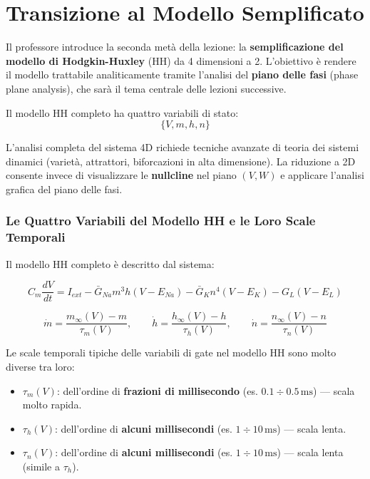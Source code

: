 \newpage

\section{Transizione al Modello Semplificato}


Il professore introduce la seconda metà della lezione: la \textbf{semplificazione del modello di Hodgkin-Huxley} (HH) da 4 dimensioni a 2. L'obiettivo è rendere il modello trattabile analiticamente tramite l'analisi del \textbf{piano delle fasi} (phase plane analysis), che sarà il tema centrale delle lezioni successive.

Il modello HH completo ha quattro variabili di stato:
\begin{equation}
\{V, m, h, n\}
\end{equation}

L'analisi completa del sistema 4D richiede tecniche avanzate di teoria dei sistemi dinamici (varietà, attrattori, biforcazioni in alta dimensione). La riduzione a 2D consente invece di visualizzare le \textbf{nullcline} nel piano $(V, W)$ e applicare l'analisi grafica del piano delle fasi.



\subsubsection{Le Quattro Variabili del Modello HH e le Loro Scale Temporali}

Il modello HH completo è descritto dal sistema:

\begin{equation}
C_m \frac{dV}{dt} = I_{ext} - \bar{G}_{Na} m^3 h (V - E_{Na}) - \bar{G}_K n^4 (V - E_K) - G_L (V - E_L)
\end{equation}

\begin{equation}
\dot{m} = \frac{m_\infty(V) - m}{\tau_m(V)}, \qquad \dot{h} = \frac{h_\infty(V) - h}{\tau_h(V)}, \qquad \dot{n} = \frac{n_\infty(V) - n}{\tau_n(V)}
\end{equation}

Le scale temporali tipiche delle variabili di gate nel modello HH sono molto diverse tra loro:
\begin{itemize}
    \item $\tau_m(V)$: dell'ordine di \textbf{frazioni di millisecondo} (es. $0.1 \div 0.5 \, \text{ms}$) — scala molto rapida.
    \item $\tau_h(V)$: dell'ordine di \textbf{alcuni millisecondi} (es. $1 \div 10 \, \text{ms}$) — scala lenta.
    \item $\tau_n(V)$: dell'ordine di \textbf{alcuni millisecondi} (es. $1 \div 10 \, \text{ms}$) — scala lenta (simile a $\tau_h$).
\end{itemize}

